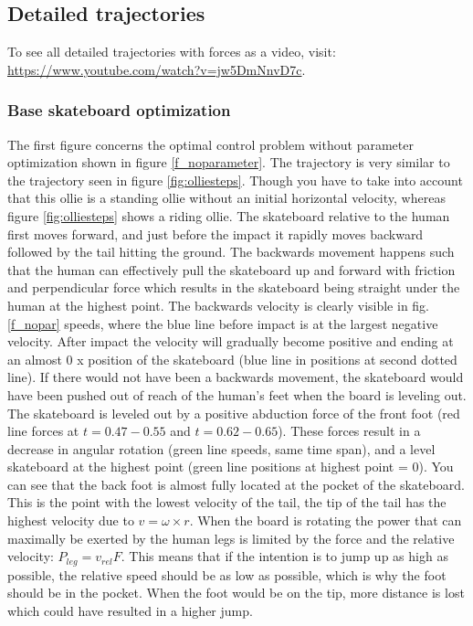 \documentclass[default,iicol]{sn-jnl}
\begin{document}
\subsection{Detailed trajectories}
To see all detailed trajectories with forces as a video, visit: \url{https://www.youtube.com/watch?v=jw5DmNnvD7c}.

\subsubsection{Base skateboard optimization}

\noindent The first figure concerns the optimal control problem without parameter optimization shown in figure \ref{f_noparameter}. The trajectory is very similar to the trajectory seen in figure \ref{fig:olliesteps}. Though you have to take into account that this ollie is a standing ollie without an initial horizontal velocity, whereas figure \ref{fig:olliesteps} shows a riding ollie. The skateboard relative to the human first moves forward, and just before the impact it rapidly moves backward followed by the tail hitting the ground. The backwards movement happens such that the human can effectively pull the skateboard up and forward with friction and perpendicular force which results in the skateboard being straight under the human at the highest point. The backwards velocity is clearly visible in fig. \ref{f_nopar} speeds, where the blue line before impact is at the largest negative velocity. After impact the velocity will gradually become positive and ending at an almost 0 x position of the skateboard (blue line in positions at second dotted line). If there would not have been a backwards movement, the skateboard would have been pushed out of reach of the human's feet when the board is leveling out. The skateboard is leveled out by a positive abduction force of the front foot (red line forces at $t=0.47-0.55$ and $t=0.62-0.65$). These forces result in a decrease in angular rotation (green line speeds, same time span), and a level skateboard at the highest point (green line positions at highest point = 0).
You can see that the back foot is almost fully located at the pocket of the skateboard. This is the point with the lowest velocity of the tail, the tip of the tail has the highest velocity due to $v = \omega \times r$. When the board is rotating the power that can maximally be exerted by the human legs is limited by the force and the relative velocity: $P_{leg} = v_{rel} F$. This means that if the intention is to jump up as high as possible, the relative speed should be as low as possible, which is why the foot should be in the pocket. When the foot would be on the tip, more distance is lost which could have resulted in a higher jump. 
\end{document}
